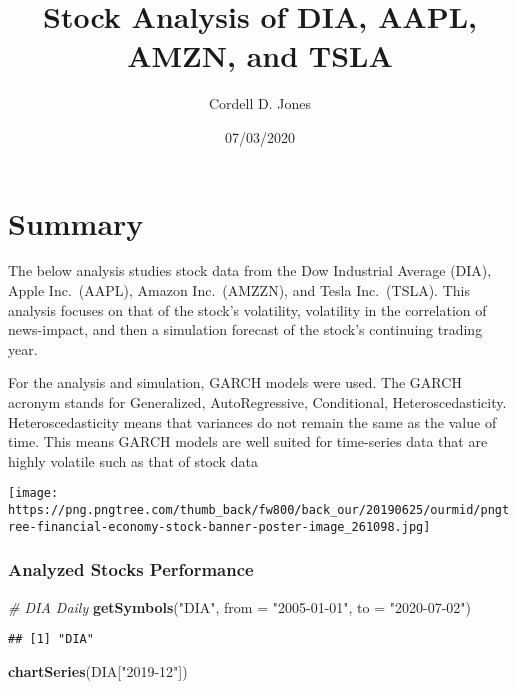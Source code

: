 \documentclass[
]{article}
\title{Stock Analysis of DIA, AAPL, AMZN, and TSLA}
\author{Cordell D. Jones}
\date{07/03/2020}
\newenvironment{Shaded}{\begin{snugshade}}{\end{snugshade}}
\newcommand{\CommentTok}[1]{\textcolor[rgb]{0.56,0.35,0.01}{\textit{#1}}}
\newcommand{\DataTypeTok}[1]{\textcolor[rgb]{0.13,0.29,0.53}{#1}}
\newcommand{\KeywordTok}[1]{\textcolor[rgb]{0.13,0.29,0.53}{\textbf{#1}}}
\newcommand{\NormalTok}[1]{#1}
\newcommand{\StringTok}[1]{\textcolor[rgb]{0.31,0.60,0.02}{#1}}
\begin{document}
\maketitle

\hypertarget{summary}{%
\section{Summary}\label{summary}}

The below analysis studies stock data from the Dow Industrial Average
(DIA), Apple Inc.~(AAPL), Amazon Inc.~(AMZZN), and Tesla Inc.~(TSLA).
This analysis focuses on that of the stock's volatility, volatility in
the correlation of news-impact, and then a simulation forecast of the
stock's continuing trading year.

For the analysis and simulation, GARCH models were used. The GARCH
acronym stands for Generalized, AutoRegressive, Conditional,
Heteroscedasticity. Heteroscedasticity means that variances do not
remain the same as the value of time. This means GARCH models are well
suited for time-series data that are highly volatile such as that of
stock data

\texttt{[image: https://png.pngtree.com/thumb\_back/fw800/back\_our/20190625/ourmid/pngtree-financial-economy-stock-banner-poster-image\_261098.jpg]}

\hypertarget{analyzed-stocks-performance}{%
\subsubsection{Analyzed Stocks
Performance}\label{analyzed-stocks-performance}}

\begin{Shaded}
\begin{Highlighting}[]
\CommentTok{# DIA Daily}
\KeywordTok{getSymbols}\NormalTok{(}\StringTok{"DIA"}\NormalTok{,}
           \DataTypeTok{from =} \StringTok{"2005-01-01"}\NormalTok{,}
           \DataTypeTok{to =} \StringTok{"2020-07-02"}\NormalTok{)}
\end{Highlighting}
\end{Shaded}

\begin{verbatim}
## [1] "DIA"
\end{verbatim}

\begin{Shaded}
\begin{Highlighting}[]
\KeywordTok{chartSeries}\NormalTok{(DIA[}\StringTok{"2019-12"}\NormalTok{])}
\end{Highlighting}
\end{Shaded}
\end{document}
